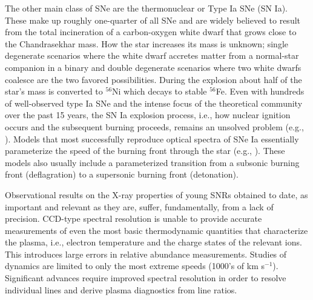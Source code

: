 \documentclass[11pt,a4paper]{article}
\begin{document}
The other main class of SNe are the thermonuclear or Type Ia SNe (SN
Ia).  These make up roughly one-quarter of all SNe and are widely
believed to result from the total incineration of a carbon-oxygen
white dwarf that grows close to the Chandrasekhar mass.  How the star
increases its mass is unknown; single degenerate scenarios where the
white dwarf accretes matter from a normal-star companion in a binary
and double degenerate scenarios where two white dwarfs coalesce are
the two favored possibilities.  During the explosion about half of the
star's mass is converted to $^{56}$Ni which decays to stable
$^{56}$Fe.  Even with hundreds of well-observed type Ia SNe and the
intense focus of the theoretical community over the past 15 years, the
SN Ia explosion process, i.e., how nuclear ignition occurs and the
subsequent burning proceeds, remains an unsolved problem (e.g.,
\citealt{ ropke08, jordan08}).  Models that most successfully
reproduce optical spectra of SNe Ia essentially parameterize the speed
of the burning front through the star (e.g., \citealt{iwamoto99}).
These models also usually include a parameterized transition from a
subsonic burning front (deflagration) to a supersonic burning front
(detonation).

Observational results on the X-ray properties of young SNRs obtained
to date, as important and relevant as they are, suffer, fundamentally,
from a lack of precision.  CCD-type spectral resolution is unable to
provide accurate measurements of even the most basic thermodynamic
quantities that characterize the plasma, i.e., electron temperature
and the charge states of the relevant ions. This introduces large
errors in relative abundance measurements.  Studies of dynamics are
limited to only the most extreme speeds (1000's of km s$^{-1}$).
Significant advances require improved spectral resolution in order to
resolve individual lines and derive plasma diagnostics from line ratios.
\end{document}
